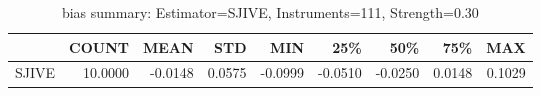 \begin{table}[ht]
\centering
\caption{bias summary: Estimator=SJIVE, Instruments=111, Strength=0.30}
\begin{tabular}{lrrrrrrrr}
\toprule
 & COUNT & MEAN & STD & MIN & 25\% & 50\% & 75\% & MAX \\
\midrule
SJIVE & 10.0000 & -0.0148 & 0.0575 & -0.0999 & -0.0510 & -0.0250 & 0.0148 & 0.1029 \\
\bottomrule
\end{tabular}
\end{table}
